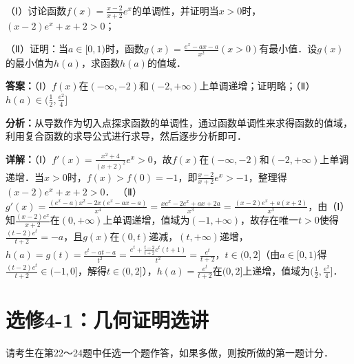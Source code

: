 \begin{question}[points=12]
（Ⅰ）讨论函数$f(x)=\frac{x-2}{x+2}e^x$的单调性，并证明当$x>0$时，$(x-2)e^x+x+2>0$；

（Ⅱ）证明：当$a\in[0,1)$时，函数$g(x)=\frac{e^x-ax-a}{x^2}(x>0)$有最小值．设$g(x)$的最小值为$h(a)$，求函数$h(a)$的值域．
\begin{solution}
\textbf{答案：}（Ⅰ）$f(x)$在$(-\infty,-2)$和$(-2,+\infty)$上单调递增；证明略；（Ⅱ）$h(a)\in(\frac{1}{2},\frac{e^2}{4}]$

\textbf{分析：}从导数作为切入点探求函数的单调性，通过函数单调性来求得函数的值域，利用复合函数的求导公式进行求导，然后逐步分析即可．

\textbf{详解：}（Ⅰ）$f'(x)=\frac{x^2+4}{(x+2)^2}e^x>0$，故$f(x)$在$(-\infty,-2)$和$(-2,+\infty)$上单调递增．当$x>0$时，$f(x)>f(0)=-1$，即$\frac{x-2}{x+2}e^x>-1$，整理得$(x-2)e^x+x+2>0$．
（Ⅱ）$g'(x)=\frac{(e^x-a)x^2-2x(e^x-ax-a)}{x^4}=\frac{xe^x-2e^x+ax+2a}{x^3}=\frac{(x-2)e^x+a(x+2)}{x^3}$，由（Ⅰ）知$\frac{(x-2)e^x}{x+2}$在$(0,+\infty)$上单调递增，值域为$(-1,+\infty)$，故存在唯一$t>0$使得$\frac{(t-2)e^t}{t+2}=-a$，且$g(x)$在$(0,t)$递减，$(t,+\infty)$递增，$h(a)=g(t)=\frac{e^t-at-a}{t^2}=\frac{e^t+\frac{t-2}{t+2}e^t(t+1)}{t^2}=\frac{e^t}{t+2}$，$t\in(0,2]$（由$a\in[0,1)$得$\frac{(t-2)e^t}{t+2}\in(-1,0]$，解得$t\in(0,2]$），$h(a)=\frac{e^t}{t+2}$在$(0,2]$上递增，值域为$(\frac12,\frac{e^2}{4}]$．
\end{solution}
\end{question}

\section*{选修4-1：几何证明选讲}
请考生在第22～24题中任选一个题作答，如果多做，则按所做的第一题计分．

